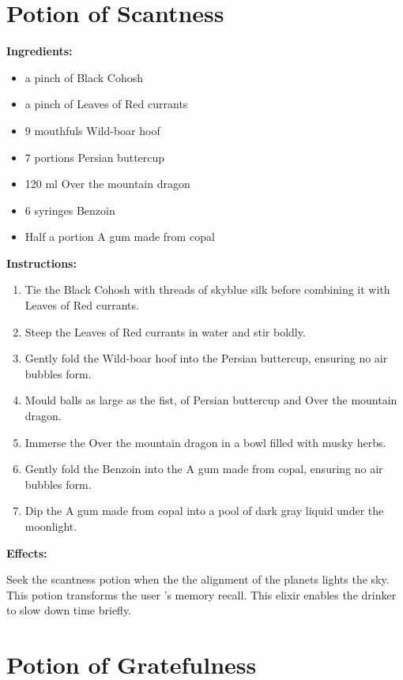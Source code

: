 \documentclass{article}
\begin{document}
\newpage
\section*{Potion of Scantness}

\textbf{Ingredients:}

\begin{itemize}
  \item a pinch of Black Cohosh
  \item a pinch of Leaves of Red currants
  \item 9 mouthfuls Wild-boar hoof
  \item 7 portions Persian buttercup
  \item 120 ml Over the mountain dragon
  \item 6 syringes Benzoin
  \item Half a portion A gum made from copal
\end{itemize}

\textbf{Instructions:}

\begin{enumerate}
  \item Tie the Black Cohosh with threads of skyblue silk before combining it with Leaves of Red currants.
  \item Steep the Leaves of Red currants in water and stir boldly.
  \item Gently fold the Wild-boar hoof into the Persian buttercup, ensuring no air bubbles form.
  \item Mould balls as large as the fist, of Persian buttercup and Over the mountain dragon.
  \item Immerse the Over the mountain dragon in a bowl filled with musky herbs.
  \item Gently fold the Benzoin into the A gum made from copal, ensuring no air bubbles form.
  \item Dip the A gum made from copal into a pool of dark gray liquid under the moonlight.
\end{enumerate}

\textbf{Effects:}

Seek the scantness potion when the the alignment of the planets lights the sky. This potion transforms the user 's memory recall. This elixir enables the drinker to slow down time briefly.

\newpage
\section*{Potion of Gratefulness}
\end{document}
